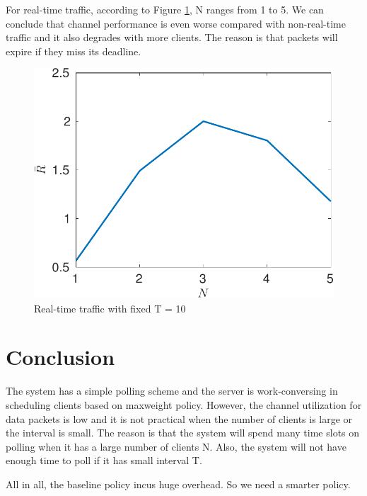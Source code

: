 \documentclass{article}
\begin{document}
For real-time traffic, according to Figure \ref{realtime_throughput_N}, N ranges from 1 to 5. We can conclude that channel performance is even worse compared with non-real-time traffic and it also degrades with more clients. The reason is that packets will expire if they miss its deadline.  

\begin{figure}[htbp]
\centering
\includegraphics[scale=0.7]{realtime_throughput_N.pdf}
\caption{Real-time traffic with fixed T = 10}
\label{realtime_throughput_N}
\end{figure}

\section{Conclusion}
The system has a simple polling scheme and the server is work-conversing in scheduling clients based on maxweight policy. However, the channel utilization for data packets is low and it is not practical when the number of clients is large or the interval is small. The reason is that the system will spend many time slots on polling when it has a large number of clients N. Also, the system will not have enough time to poll if it has small interval T. 

All in all, the baseline policy incus huge overhead. So we need a smarter policy.
\end{document}
